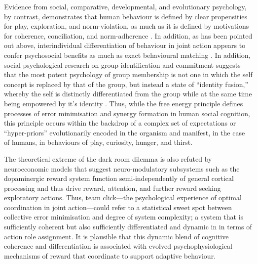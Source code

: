 Evidence from social, comparative, developmental, and evolutionary psychology, by contrast, demonstrates that human behaviour is defined by clear propensities for play, exploration, and norm-violation, as much as it is defined by motivations for coherence, conciliation, and norm-adherence \citep{McNeill1995,Huizinga2003}. In addition, as has been pointed out above, interindividual differentiation of behaviour in joint action appears to confer psychosocial benefits as much as exact behavioural matching \citep{Milward2016}.
In addition, social psychological research on group identification and commitment suggests that the most potent psychology of group membership is not one in which the self concept is replaced by that of the group, but instead a state of ``identity fusion,'' whereby the self is distinctly differentiated from the group while at the same time being empowered by it's identity \citep{Swann2012,Swann2015,Whitehouse2014}. Thus, while the free energy principle defines processes of error minimisation and synergy formation in human social cognition, this principle occurs within the backdrop of a complex set of expectations or ``hyper-priors'' evolutionarily encoded in the organism and manifest, in the case of humans, in behaviours of play, curiosity, hunger, and thirst\citep{Clark2013}.

The theoretical extreme of the dark room dilemma is also refuted by neuroeconomic models that suggest neuro-modulatory subsystems such as the dopaminergic reward system function semi-independently of general cortical processing and thus drive reward, attention, and further reward seeking exploratory actions\citep{Ross2013}.
Thus, team click---the psychological experience of optimal coordination in joint action---could refer to a statistical sweet spot between collective error minimisation and degree of system complexity; a system that is sufficiently coherent but also sufficiently differentiated and dynamic in in terms of action role assignment.  It is plausible that this dynamic blend of cognitive coherence and differentiation is associated with evolved psychophysiological mechanisms of reward that coordinate to support adaptive behaviour\citep{Friston2010,Clark2013}.

